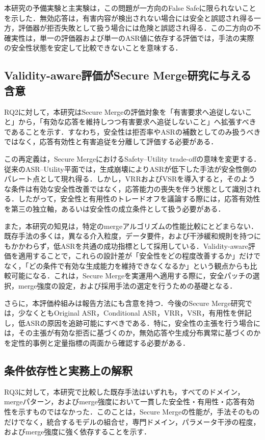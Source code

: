 \documentclass{article}
\begin{document}
本研究の予備実験と主実験は，この問題が一方向のFalse Safeに限られないことを示した．無効応答は，有害内容が検出されない場合には安全と誤認され得る一方，評価器が拒否失敗として扱う場合には危険と誤認され得る．この二方向の不確実性は，単一の評価器および単一のASR値に依存する評価では，手法の実際の安全性状態を安定して比較できないことを意味する．

\subsection{Validity-aware評価がSecure Merge研究に与える含意}
RQ2に対して，本研究はSecure Mergeの評価対象を「有害要求へ追従しないこと」から，「有効な応答を維持しつつ有害要求へ追従しないこと」へ拡張すべきであることを示す．すなわち，安全性は拒否率やASRの補数としてのみ扱うべきではなく，応答有効性と有害追従を分離して評価する必要がある．

この再定義は，Secure MergeにおけるSafety--Utility trade-offの意味を変更する．従来のASR--Utility平面では，生成崩壊によりASRが低下した手法が安全性側のパレート点として現れ得る．しかし，VRRおよびVSRを導入すると，そのような条件は有効な安全性改善ではなく，応答能力の喪失を伴う状態として識別される．したがって，安全性と有用性のトレードオフを議論する際には，応答有効性を第三の独立軸，あるいは安全性の成立条件として扱う必要がある．

また，本研究の知見は，特定のmergeアルゴリズムの性能比較にとどまらない．既存手法の多くは，異なる介入粒度，データ要件，および干渉緩和規則を持つにもかかわらず，低ASRを共通の成功指標として採用している．Validity-aware評価を適用することで，これらの設計差が「安全性をどの程度改善するか」だけでなく，「どの条件で有効な生成能力を維持できなくなるか」という観点からも比較可能になる．これは，Secure Mergeを実運用へ適用する際に，安全パッチの選択，merge強度の設定，および採用手法の選定を行うための基礎となる．

さらに，本評価枠組みは報告方法にも含意を持つ．今後のSecure Merge研究では，少なくともOriginal ASR，Conditional ASR，VRR，VSR，有用性を併記し，低ASRの原因を追跡可能にすべきである．特に，安全性の主張を行う場合には，その主張が有効な拒否に基づくのか，無効応答や生成分布異常に基づくのかを定性的事例と定量指標の両面から確認する必要がある．

\subsection{条件依存性と実務上の解釈}

RQ3に対して，本研究で比較した既存手法はいずれも，すべてのドメイン，mergeパターン，およびmerge強度において一貫した安全性・有用性・応答有効性を示すものではなかった．このことは，Secure Mergeの性能が，手法そのものだけでなく，統合するモデルの組合せ，専門ドメイン，パラメータ干渉の程度，およびmerge強度に強く依存することを示す．
\end{document}

